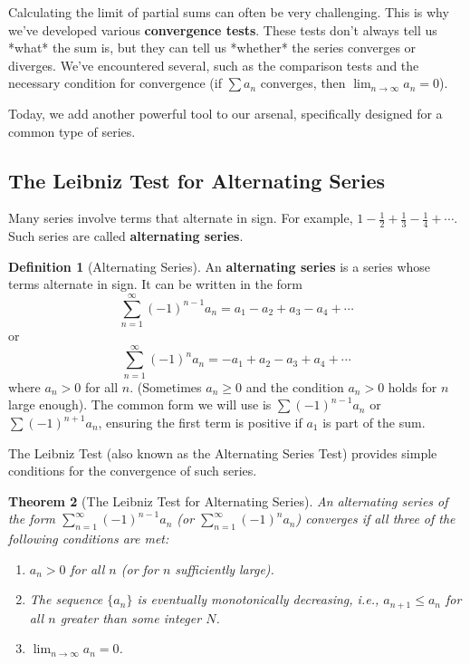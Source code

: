 \documentclass[11pt, a4paper]{article}
\theoremstyle{plain}
\newtheorem{theorem}{Theorem}[section]
\theoremstyle{definition}
\newtheorem{definition}[theorem]{Definition}
\theoremstyle{remark}
\begin{document}
Calculating the limit of partial sums can often be very challenging. This is why we've developed various \textbf{convergence tests}. These tests don't always tell us *what* the sum is, but they can tell us *whether* the series converges or diverges. We've encountered several, such as the comparison tests and the necessary condition for convergence (if $\sum a_n$ converges, then $\lim_{n \to \infty} a_n = 0$).

Today, we add another powerful tool to our arsenal, specifically designed for a common type of series.

\subsection{The Leibniz Test for Alternating Series}

Many series involve terms that alternate in sign. For example, $1 - \frac{1}{2} + \frac{1}{3} - \frac{1}{4} + \dotsb$. Such series are called \textbf{alternating series}.

\begin{definition}[Alternating Series]
An \textbf{alternating series} is a series whose terms alternate in sign. It can be written in the form
\[ \sum_{n=1}^{\infty} (-1)^{n-1} a_n = a_1 - a_2 + a_3 - a_4 + \dotsb \]
or
\[ \sum_{n=1}^{\infty} (-1)^{n} a_n = -a_1 + a_2 - a_3 + a_4 + \dotsb \]
where $a_n > 0$ for all $n$. (Sometimes $a_n \ge 0$ and the condition $a_n > 0$ holds for $n$ large enough).
The common form we will use is $\sum (-1)^{n-1} a_n$ or $\sum (-1)^{n+1} a_n$, ensuring the first term is positive if $a_1$ is part of the sum.
\end{definition}

The Leibniz Test (also known as the Alternating Series Test) provides simple conditions for the convergence of such series.

\begin{theorem}[The Leibniz Test for Alternating Series]
An alternating series of the form $\sum_{n=1}^{\infty} (-1)^{n-1} a_n$ (or $\sum_{n=1}^{\infty} (-1)^{n} a_n$) converges if all three of the following conditions are met:
\begin{enumerate}[label=(\roman*)]
    \item $a_n > 0$ for all $n$ (or for $n$ sufficiently large).
    \item The sequence $\{a_n\}$ is eventually monotonically decreasing, i.e., $a_{n+1} \le a_n$ for all $n$ greater than some integer $N$.
    \item $\lim_{n \to \infty} a_n = 0$.
\end{enumerate}
\end{theorem}
\end{document}
